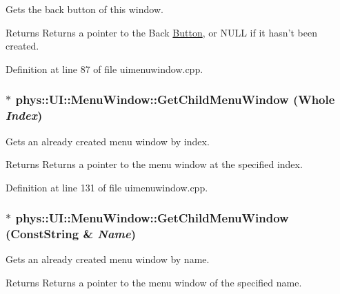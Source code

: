 Gets the back button of this window. 

\begin{DoxyReturn}{Returns}
Returns a pointer to the Back \hyperlink{classphys_1_1UI_1_1Button}{Button}, or NULL if it hasn't been created. 
\end{DoxyReturn}


Definition at line 87 of file uimenuwindow.cpp.

\hypertarget{classphys_1_1UI_1_1MenuWindow_ae3ea20dba208e0a44434c55149c3ea5f}{
\subsubsection[{GetChildMenuWindow}]{ $\ast$ phys::UI::MenuWindow::GetChildMenuWindow ({\bf Whole} {\em Index})}}
\label{d4/d07/classphys_1_1UI_1_1MenuWindow_ae3ea20dba208e0a44434c55149c3ea5f}


Gets an already created menu window by index. 

\begin{DoxyReturn}{Returns}
Returns a pointer to the menu window at the specified index. 
\end{DoxyReturn}


Definition at line 131 of file uimenuwindow.cpp.

\hypertarget{classphys_1_1UI_1_1MenuWindow_ad1136c4e4b2ff9b9dc5d6aac2dba45a7}{
\subsubsection[{GetChildMenuWindow}]{ $\ast$ phys::UI::MenuWindow::GetChildMenuWindow ({\bf ConstString} \& {\em Name})}}
\label{d4/d07/classphys_1_1UI_1_1MenuWindow_ad1136c4e4b2ff9b9dc5d6aac2dba45a7}


Gets an already created menu window by name. 

\begin{DoxyReturn}{Returns}
Returns a pointer to the menu window of the specified name. 
\end{DoxyReturn}


